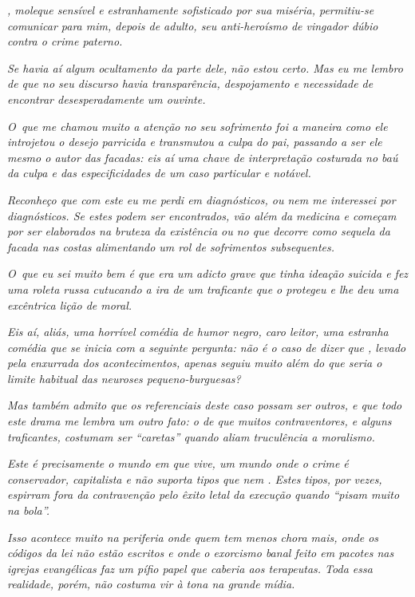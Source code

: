 \emph{, moleque sensível e estranhamente sofisticado por sua miséria,
permitiu-se comunicar para mim, depois de adulto, seu anti-heroísmo de
vingador dúbio contra o crime paterno.}

\emph{Se havia aí algum ocultamento da parte dele, não estou certo. Mas
eu me lembro de que no seu discurso havia transparência, despojamento e
necessidade de encontrar desesperadamente um ouvinte.}

\emph{O~que me chamou muito a atenção no seu sofrimento foi a maneira
como ele introjetou o desejo parricida e transmutou a culpa do pai,
passando a ser ele mesmo o autor das facadas: eis aí uma chave de
interpretação costurada no baú da culpa e das especificidades de um caso
particular e notável.}

\emph{Reconheço que com este  eu me perdi em diagnósticos, ou nem me
interessei por diagnósticos. Se estes podem ser encontrados, vão além da
medicina e começam por ser elaborados na bruteza da existência ou no que
decorre como sequela da facada nas costas alimentando um rol de
sofrimentos subsequentes.}

\emph{O~que eu sei muito bem é que  era um adicto grave que tinha
ideação suicida e fez uma roleta russa cutucando a ira de um traficante
que o protegeu e lhe deu uma excêntrica lição de moral.}

\emph{Eis aí, aliás, uma horrível comédia de humor negro, caro leitor,
uma estranha comédia que se inicia com a seguinte pergunta: não é o caso
de dizer que , levado pela enxurrada dos acontecimentos, apenas seguiu
muito além do que seria o limite habitual das neuroses pequeno-burguesas?}

\emph{Mas também admito que os referenciais deste caso possam ser
outros, e que todo este drama me lembra um outro fato: o de que muitos
contraventores, e alguns traficantes, costumam ser ``caretas'' quando
aliam truculência a moralismo.}

\emph{Este é precisamente o mundo em que  vive, um mundo onde o crime
é conservador, capitalista e não suporta tipos que nem . Estes tipos,
por vezes, espirram fora da contravenção pelo êxito letal da execução
quando ``pisam muito na bola''.}

\emph{Isso acontece muito na periferia onde quem tem menos chora mais,
onde os códigos da lei não estão escritos e onde o exorcismo banal feito
em pacotes nas igrejas evangélicas faz um pífio papel que caberia aos
terapeutas. Toda essa realidade, porém, não costuma vir à tona na grande
mídia.}

